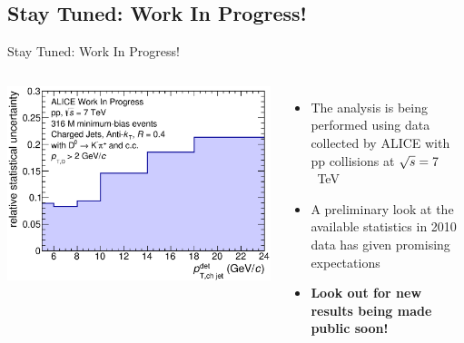 \documentclass[xcolor={usenames,dvipsnames}]{beamer}
\begin{document}
\subsection*{Stay Tuned: Work In Progress!}
\begin{frame}{Stay Tuned: Work In Progress!}
\begin{columns}
\includegraphics[width=\textwidth]{img/HQ16_WorkInProgress_StatisticalUncertainty} 

\begin{itemize}
\item The analysis is being performed using data collected by ALICE with pp collisions at $\sqrt{s}=7$~TeV
\item A preliminary look at the available statistics in 2010 data has given promising expectations
\item \textbf{\alert{Look out for new results being made public soon!}}
\end{itemize}
\end{columns}
\end{frame}


\end{document}
